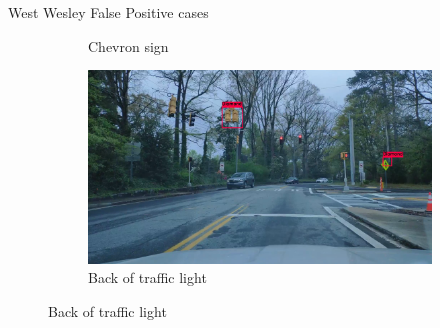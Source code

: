 \documentclass{beamer}
\begin{document}
\begin{frame}{West Wesley False Positive cases}
\begin{figure}
\begin{center}
\begin{subfigure}[t]{.49\linewidth}
          \caption{Chevron sign}
          \label{fig:wwChevron2FP}
        \end{subfigure}
        \begin{subfigure}[t]{.49\linewidth}
          \centering
          \includegraphics[width=0.99\linewidth]{figures/examples/westwestley/FP/FP09.png}
           \caption{Back of traffic light}
          \label{fig:wwTraffficLight2FP}
        \end{subfigure}
        \label{fig:wwFPcases}
      \end{center}
    \end{figure}
\end{frame}{}
\end{document}

